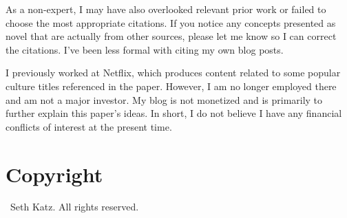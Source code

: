 \documentclass{article}
\begin{document}
As a non-expert, I may have also overlooked relevant prior work or failed to choose the most appropriate citations. If you notice any concepts presented as novel that are actually from other sources, please let me know so I can correct the citations. I've been less formal with citing my own blog posts.

I previously worked at Netflix, which produces content related to some popular culture titles referenced in the paper.   However, I am no longer employed there and am not a major investor. My blog is not monetized and is primarily to further explain this paper's ideas.   In short, I do not believe I have any financial conflicts of interest at the present time.

\section{Copyright}
\small
\textcopyright\ Seth Katz. All rights reserved.

 
\printbibliography 
\end{document}
